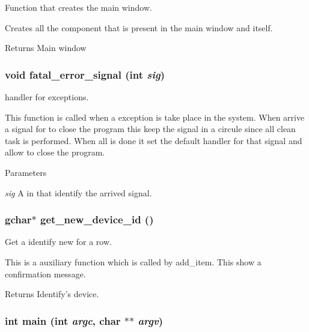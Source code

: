 Function that creates the main window. 

Creates all the component that is present in the main window and itself. \begin{DoxyReturn}{Returns}
Main window 
\end{DoxyReturn}
\hypertarget{usb-gui_8h_ad870b459afa4a0b65382e4bb1a57ae10}{
\subsubsection[{fatal\_\-error\_\-signal}]{\setlength{\rightskip}{0pt plus 5cm}void fatal\_\-error\_\-signal (int {\em sig})}}
\label{usb-gui_8h_ad870b459afa4a0b65382e4bb1a57ae10}


handler for exceptions. 

This function is called when a exception is take place in the system. When arrive a signal for to close the program this keep the signal in a circule since all clean task is performed. When all is done it set the default handler for that signal and allow to close the program. 
\begin{DoxyParams}{Parameters}
\item[{\em sig}]A in that identify the arrived signal. \end{DoxyParams}
\hypertarget{usb-gui_8h_abf4085a43262b45dfe7d93ba0cbd102c}{
\subsubsection[{get\_\-new\_\-device\_\-id}]{\setlength{\rightskip}{0pt plus 5cm}gchar$\ast$ get\_\-new\_\-device\_\-id ()}}
\label{usb-gui_8h_abf4085a43262b45dfe7d93ba0cbd102c}


Get a identify new for a row. 

This is a auxiliary function which is called by add\_\-item. This show a confirmation message. \begin{DoxyReturn}{Returns}
Identify's device. 
\end{DoxyReturn}
\hypertarget{usb-gui_8h_a3c04138a5bfe5d72780bb7e82a18e627}{
\subsubsection[{main}]{\setlength{\rightskip}{0pt plus 5cm}int main (int {\em argc}, \/  char $\ast$$\ast$ {\em argv})}}
\label{usb-gui_8h_a3c04138a5bfe5d72780bb7e82a18e627}



